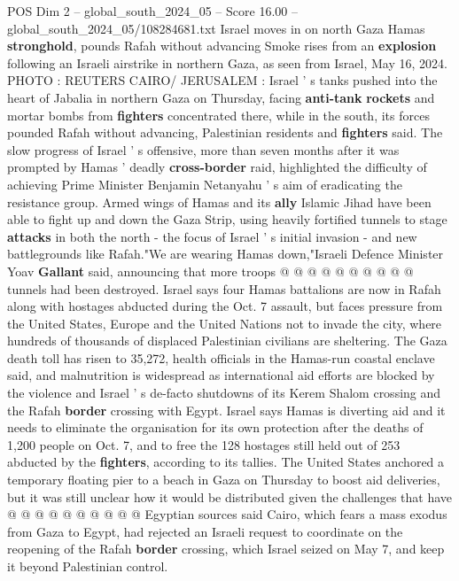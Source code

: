 \begin{textsample}{POS Dim 2 – global\_south\_2024\_05 – Score 16.00 – global\_south\_2024\_05/108284681.txt}  \label{ex:f2_pos_226}
Israel moves in on north Gaza Hamas \textbf{stronghold}, pounds Rafah without advancing Smoke rises from an \textbf{explosion} following an Israeli airstrike in northern Gaza, as seen from Israel, May 16, 2024.
PHOTO : REUTERS CAIRO/ JERUSALEM : Israel ' s tanks pushed into the heart of Jabalia in northern Gaza on Thursday, facing \textbf{anti-tank} \textbf{rockets} and mortar bombs from \textbf{fighters} concentrated there, while in the south, its forces pounded Rafah without advancing, Palestinian residents and \textbf{fighters} said.
The slow progress of Israel ' s offensive, more than seven months after it was prompted by Hamas ' deadly \textbf{cross-border} raid, highlighted the difficulty of achieving Prime Minister Benjamin Netanyahu ' s aim of eradicating the resistance group.
Armed wings of Hamas and its \textbf{ally} Islamic Jihad have been able to fight up and down the Gaza Strip, using heavily fortified tunnels to stage \textbf{attacks} in both the north - the focus of Israel ' s initial invasion - and new battlegrounds like Rafah."We are wearing Hamas down,"Israeli Defence Minister Yoav \textbf{Gallant} said, announcing that more troops @ @ @ @ @ @ @ @ @ @ tunnels had been destroyed.
Israel says four Hamas battalions are now in Rafah along with hostages abducted during the Oct. 7 assault, but faces pressure from the United States, Europe and the United Nations not to invade the city, where hundreds of thousands of displaced Palestinian civilians are sheltering.
The Gaza death toll has risen to 35,272, health officials in the Hamas-run coastal enclave said, and malnutrition is widespread as international aid efforts are blocked by the violence and Israel ' s de-facto shutdowns of its Kerem Shalom crossing and the Rafah \textbf{border} crossing with Egypt.
Israel says Hamas is diverting aid and it needs to eliminate the organisation for its own protection after the deaths of 1,200 people on Oct. 7, and to free the 128 hostages still held out of 253 abducted by the \textbf{fighters}, according to its tallies.
The United States anchored a temporary floating pier to a beach in Gaza on Thursday to boost aid deliveries, but it was still unclear how it would be distributed given the challenges that have @ @ @ @ @ @ @ @ @ @ Egyptian sources said Cairo, which fears a mass exodus from Gaza to Egypt, had rejected an Israeli request to coordinate on the reopening of the Rafah \textbf{border} crossing, which Israel seized on May 7, and keep it beyond Palestinian control.

\end{textsample}
